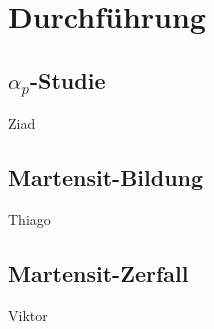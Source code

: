 \chapter{Durchführung}

\section{$\alpha_p$-Studie}{Ziad}

\section{Martensit-Bildung}{Thiago}

\section{Martensit-Zerfall}{Viktor}